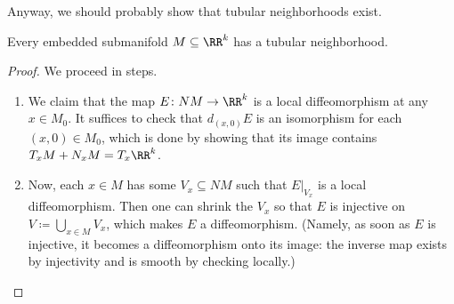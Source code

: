 \documentclass[../notes.tex]{subfiles}
\begin{document}
Anyway, we should probably show that tubular neighborhoods exist.
\begin{proposition} \label{prop:tubular-neighborhood}
	Every embedded submanifold $M\subseteq\RR^k$ has a tubular neighborhood.
\end{proposition}
\begin{proof}
	We proceed in steps.
	\begin{enumerate}
		\item We claim that the map $E\colon NM\to\RR^k$ is a local diffeomorphism at any $x\in M_0$. It suffices to check that $d_{(x,0)}E$ is an isomorphism for each $(x,0)\in M_0$, which is done by showing that its image contains $T_xM+N_xM=T_x\RR^k$.
		\item Now, each $x\in M$ has some $V_x\subseteq NM$ such that $E|_{V_x}$ is a local diffeomorphism. Then one can shrink the $V_x$ so that $E$ is injective on $V\coloneqq\bigcup_{x\in M}V_x$, which makes $E$ a diffeomorphism. (Namely, as soon as $E$ is injective, it becomes a diffeomorphism onto its image: the inverse map exists by injectivity and is smooth by checking locally.)
		\qedhere
	\end{enumerate}
\end{proof}
\end{document}
